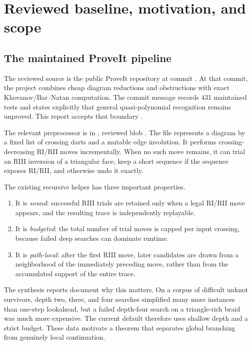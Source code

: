\section{Reviewed baseline, motivation, and scope}
\label{sec:baseline}

\subsection{The maintained ProveIt pipeline}

The reviewed source is the public ProveIt repository at commit
.  At that commit, the project
combines cheap diagram reductions and obstructions with exact Khovanov/Bar--Natan
computation.  The commit message records 431 maintained tests and states
explicitly that general quasi-polynomial recognition remains unproved.  This
report accepts that boundary \cite{ProveIt2026}.

The relevant preprocessor is in
, reviewed blob
.  The file represents a diagram
by a fixed list of crossing darts and a mutable edge involution.  It performs
crossing-decreasing RI/RII moves incrementally.  When no such move remains, it
can trial an RIII inversion of a triangular face, keep a short sequence if the
sequence exposes RI/RII, and otherwise undo it exactly.

The existing recursive helper has three important properties.
\begin{enumerate}
\item It is \emph{sound}: successful RIII trials are retained only when a legal
      RI/RII move appears, and the resulting trace is independently replayable.
\item It is \emph{budgeted}: the total number of trial moves is capped per input
      crossing, because failed deep searches can dominate runtime.
\item It is \emph{path-local}: after the first RIII move, later candidates are
      drawn from a neighborhood of the immediately preceding move, rather than
      from the accumulated support of the entire trace.
\end{enumerate}

The synthesis reports document why this matters.  On a corpus of difficult
unknot survivors, depth two, three, and four searches simplified many more
instances than one-step lookahead, but a failed depth-four search on a
triangle-rich braid was much more expensive.  The current default therefore
uses shallow depth and a strict budget.  These data motivate a theorem that
separates global branching from genuinely local continuation.

